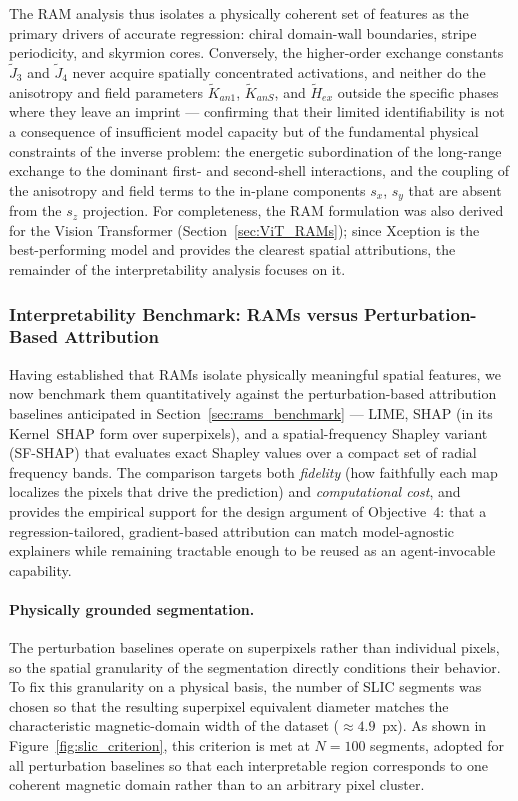 \documentclass[letterpaper, 12, one column]{article}
\begin{document}
The RAM analysis thus isolates a physically coherent set of features as
the primary drivers of accurate regression: chiral domain-wall
boundaries, stripe periodicity, and skyrmion cores. Conversely, the
higher-order exchange constants $\tilde{J}_3$ and $\tilde{J}_4$ never
acquire spatially concentrated activations, and neither do the
anisotropy and field parameters $\tilde{K}_{an1}$, $\tilde{K}_{anS}$,
and $\tilde{H}_{ex}$ outside the specific phases where they leave an
imprint --- confirming that their limited identifiability is not a
consequence of insufficient model capacity but of the fundamental
physical constraints of the inverse problem: the energetic
subordination of the long-range exchange to the dominant first- and
second-shell interactions, and the coupling of the anisotropy and field
terms to the in-plane components $s_x$, $s_y$ that are absent from the
$s_z$ projection. For completeness, the RAM formulation was also derived
for the Vision Transformer (Section~\ref{sec:ViT_RAMs}); since Xception
is the best-performing model and provides the clearest spatial
attributions, the remainder of the interpretability analysis focuses on
it.

\subsubsection{Interpretability Benchmark: RAMs versus Perturbation-Based Attribution}
\label{sec:interpretability_benchmark_results}

Having established that RAMs isolate physically meaningful spatial
features, we now benchmark them quantitatively against the
perturbation-based attribution baselines anticipated in
Section~\ref{sec:rams_benchmark} --- LIME, SHAP (in its Kernel~SHAP
form over superpixels), and a spatial-frequency Shapley variant
(SF-SHAP) that evaluates exact Shapley values over a compact set of
radial frequency bands. The comparison targets both \emph{fidelity}
(how faithfully each map localizes the pixels that drive the
prediction) and \emph{computational cost}, and provides the empirical
support for the design argument of Objective~4: that a regression-tailored,
gradient-based attribution can match model-agnostic explainers while
remaining tractable enough to be reused as an agent-invocable capability.

\paragraph{Physically grounded segmentation.}
The perturbation baselines operate on superpixels rather than
individual pixels, so the spatial granularity of the segmentation
directly conditions their behavior. To fix this granularity on a
physical basis, the number of SLIC segments was chosen so that the
resulting superpixel equivalent diameter matches the characteristic
magnetic-domain width of the dataset ($\approx 4.9$~px). As shown in
Figure~\ref{fig:slic_criterion}, this criterion is met at $N=100$
segments, adopted for all perturbation baselines so that each
interpretable region corresponds to one coherent magnetic domain
rather than to an arbitrary pixel cluster.
\end{document}

